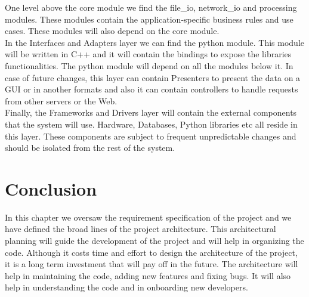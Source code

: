 \begin{spacing}{1.2}
    One level above the core module we find the file\_io, network\_io and processing modules.
    These modules contain the application-specific business rules and use cases.
    These modules will also depend on the core module.\\

    In the Interfaces and Adapters layer we can find the python module. This module will be written in C++
    and it will contain the bindings to expose the libraries functionalities. The python module
    will depend on all the modules below it. In case of future changes, this layer can contain
    Presenters to present the data on a GUI or in another formats and also it can contain
    controllers to handle requests from other servers or the Web.\\

    Finally, the Frameworks and Drivers layer will contain the external components that the system
    will use. Hardware, Databases, Python libraries etc all reside in this layer. These components
    are subject to frequent unpredictable changes and should be isolated from the rest of the
    system.\\




    \section*{Conclusion}
    In this chapter we oversaw the requirement specification of the project and we have 
    defined the broad lines of the project architecture. This architectural planning 
    will guide the development of the project and will help in organizing the code. 
    Although it costs time and effort to design the architecture of the project, it is 
    a long term investment that will pay off in the future. The architecture will help
    in maintaining the code, adding new features and fixing bugs. It will also help in
    understanding the code and in onboarding new developers.\\





\end{spacing}
